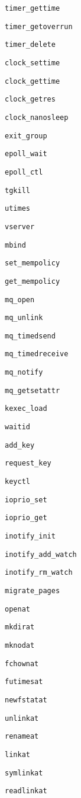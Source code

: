 \verb+timer_gettime+

\verb+timer_getoverrun+

\verb+timer_delete+

\verb+clock_settime+

\verb+clock_gettime+

\verb+clock_getres+

\verb+clock_nanosleep+

\verb+exit_group+

\verb+epoll_wait+

\verb+epoll_ctl+

\verb+tgkill+

\verb+utimes+

\verb+vserver+

\verb+mbind+

\verb+set_mempolicy+

\verb+get_mempolicy+

\verb+mq_open+

\verb+mq_unlink+

\verb+mq_timedsend+

\verb+mq_timedreceive+

\verb+mq_notify+

\verb+mq_getsetattr+

\verb+kexec_load+

\verb+waitid+

\verb+add_key+

\verb+request_key+

\verb+keyctl+

\verb+ioprio_set+

\verb+ioprio_get+

\verb+inotify_init+

\verb+inotify_add_watch+

\verb+inotify_rm_watch+

\verb+migrate_pages+

\verb+openat+

\verb+mkdirat+

\verb+mknodat+

\verb+fchownat+

\verb+futimesat+

\verb+newfstatat+

\verb+unlinkat+

\verb+renameat+

\verb+linkat+

\verb+symlinkat+

\verb+readlinkat+

